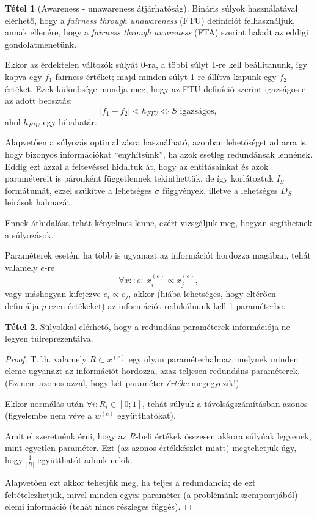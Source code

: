 \documentclass[twocolumn]{article}
\theoremstyle{definition}
\newtheorem{theorem}{Tétel}[section]
\newcommand{\ent}[2]{ {#1}^{(#2)} }
\begin{document}
    \begin{theorem}[Awareness - unawareness átjárhatóság]
        Bináris súlyok használatával elérhető, hogy a \textit{fairness through unawareness} (FTU) definíciót felhasználjuk, annak ellenére, hogy a \textit{fairness through awareness} (FTA) szerint haladt az eddigi gondolatmenetünk. 
        
        Ekkor az érdektelen változók súlyát 0-ra, a többi súlyt 1-re kell beállítanunk, így kapva egy $f_1$ fairness értéket; majd minden súlyt 1-re állítva kapunk egy $f_2$ értéket. Ezek különbsége mondja meg, hogy az FTU definíció szerint igazságos-e az adott beosztás:
        $$ |f_1 - f_2| < h_{FTU} \Leftrightarrow S \text{ igazságos}, $$
        ahol $h_{FTU}$ egy hibahatár.
    \end{theorem}
    
    Alapvetően a súlyozás optimalizásra használható, azonban lehetőséget ad arra is, hogy bizonyos információkat \enquote{enyhítsünk}, ha azok esetleg redundánsak lennének. Eddig ezt azzal a feltevéssel hidaltuk át, hogy az entitásainkat és azok paramétereit is páronként függetlennek tekinthettük, de így korlátoztuk $I_S$ formátumát, ezzel szűkítve a lehetséges $\sigma$ függvények, illetve a lehetséges $D_S$ leírások halmazát.
    
    Ennek áthidalása tehát kényelmes lenne, ezért vizsgáljuk meg, hogyan segíthetnek a súlyozások.

    Paraméterek esetén, ha több is ugyanazt az információt hordozza magában, tehát valamely $e$-re $$\forall x::e : \ \ent x e _i \propto \ent x e _j,$$ vagy máshogyan kifejezve $e_i \propto e_j$, akkor (hiába lehetséges, hogy eltérően definiálja $p$ ezen értékeket) az információt redukálnunk kell 1 paraméterbe.

    \begin{theorem}
        Súlyokkal elérhető, hogy a redundáns paraméterek információja ne legyen túlreprezentálva.
        
        \begin{proof}
            T.f.h. valamely $R \subset \ent x e$ egy olyan paraméterhalmaz, melynek minden eleme ugyanazt az információt hordozza, azaz teljesen redundáns paraméterek. (Ez nem azonos azzal, hogy két paraméter \textit{értéke} megegyezik!)
            
            Ekkor normálás után $\forall i: R_i \in [0;1]$, tehát súlyuk a távolságszámításban azonos (figyelembe nem véve a $\ent w e$ együtthatókat). 
            
            Amit el szeretnénk érni, hogy az $R$-beli értékek összesen akkora súlyúak legyenek, mint egyetlen paraméter. Ezt (az azonos értékkészlet miatt) megtehetjük úgy, hogy $\frac{1}{|R|}$ együtthatót adunk nekik.
            
            Alapvetően ezt akkor tehetjük meg, ha teljes a redundancia; de ezt feltételezhetjük, mivel minden egyes paraméter (a problémánk szempontjából) elemi információ (tehát nincs részleges függés).
        \end{proof}
    \end{theorem}
    
\end{document}
